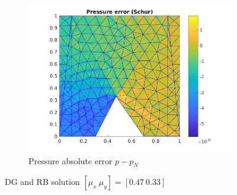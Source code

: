 \documentclass[graybox]{svmult}
\begin{document}
\begin{figure}
\begin{subfigure}{0.31\textwidth}
\includegraphics[width=\linewidth]{pressure_error_at_47_33.jpg}
\caption{Pressure absolute error $p-p_N$} \label{pre_error}
\end{subfigure}
\caption{DG and RB solution $[\mu_x \ \mu_y] = [0.47 \ 0.33]$} 
\label{dg_rb_solution_47_33}
\end{figure}
\end{document}
